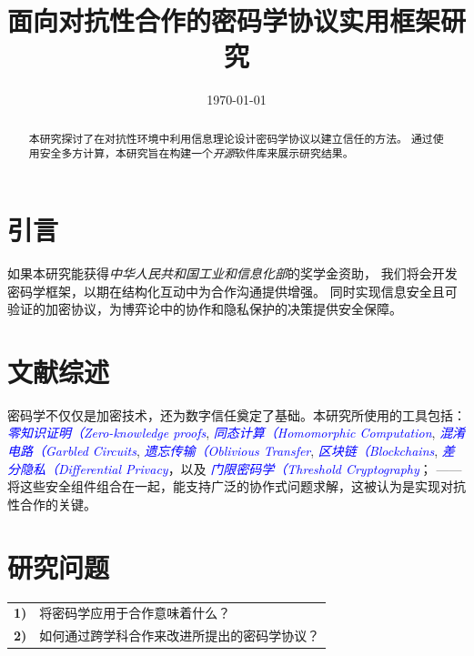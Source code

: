 \documentclass[conference]{IEEEtran}
\date{\today}
\begin{document}
\title{面向对抗性合作的密码学协议实用框架研究}
\author{
}

\maketitle

\begin{abstract}
本研究探讨了在对抗性环境中利用信息理论设计密码学协议以建立信任的方法。
通过使用安全多方计算，本研究旨在构建一个\textit{开源}软件库来展示研究结果。
\end{abstract}

\section{引言}
如果本研究能获得\textit{中华人民共和国工业和信息化部}的奖学金资助，
我们将会开发密码学框架，以期在结构化互动中为合作沟通提供增强。
同时实现信息安全且可验证的加密协议，为博弈论中的协作和隐私保护的决策提供安全保障。

\section{文献综述}
密码学不仅仅是加密技术，还为数字信任奠定了基础。本研究所使用的工具包括：
\textcolor{blue}{\textit{零知识证明（Zero-knowledge proofs}},
\textcolor{blue}{\textit{同态计算（Homomorphic Computation}},
\textcolor{blue}{\textit{混淆电路（Garbled Circuits}},
\textcolor{blue}{\textit{遗忘传输（Oblivious Transfer}},
\textcolor{blue}{\textit{区块链（Blockchains}},
\textcolor{blue}{\textit{差分隐私（Differential Privacy}}，以及
\textcolor{blue}{\textit{门限密码学（Threshold Cryptography}}；
——将这些安全组件组合在一起，能支持广泛的协作式问题求解，这被认为是实现对抗性合作的关键。

\vspace{5pt}
\section{研究问题}

\begin{tabular}{lp{210pt}}
    {\small \textbf{1)}} & {\small 将密码学应用于合作意味着什么？} \\
    {\small \textbf{2)}} & {\small 如何通过跨学科合作来改进所提出的密码学协议？}
\end{tabular}
\end{document}
